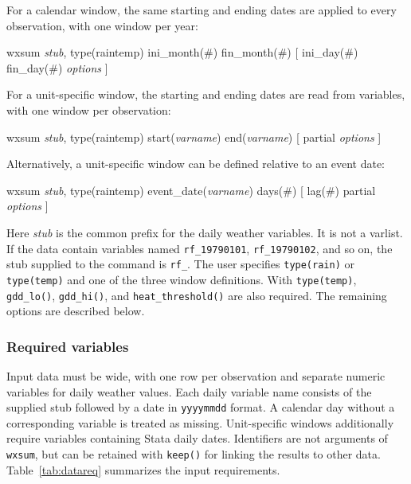For a calendar window, the same starting and ending dates are applied to every observation, with one window per year:

\begin{stsyntax}
	wxsum {\it stub\/}, type(rain\textbar temp)
	ini\_month(\#) fin\_month(\#)
	[ ini\_day(\#) fin\_day(\#) {\it options\/} ]
\end{stsyntax}

\noindent For a unit-specific window, the starting and ending dates are read from variables, with one window per observation:

\begin{stsyntax}
	wxsum {\it stub\/}, type(rain\textbar temp)
	start({\it varname\/}) end({\it varname\/})
	[ partial {\it options\/} ]
\end{stsyntax}

\noindent Alternatively, a unit-specific window can be defined relative to an event date:

\begin{stsyntax}
	wxsum {\it stub\/}, type(rain\textbar temp)
	event\_date({\it varname\/}) days(\#)
	[ lag(\#) partial {\it options\/} ]
\end{stsyntax}

\noindent Here \textit{stub} is the common prefix for the daily weather variables. It is not a varlist. If the data contain variables named \texttt{rf\_19790101}, \texttt{rf\_19790102}, and so on, the stub supplied to the command is \texttt{rf\_}. The user specifies \texttt{type(rain)} or \texttt{type(temp)} and one of the three window definitions. With \texttt{type(temp)}, \texttt{gdd\_lo()}, \texttt{gdd\_hi()}, and \texttt{heat\_threshold()} are also required. The remaining options are described below.

\subsubsection{Required variables}

Input data must be wide, with one row per observation and separate numeric variables for daily weather values. Each daily variable name consists of the supplied stub followed by a date in \texttt{yyyymmdd} format. A calendar day without a corresponding variable is treated as missing. Unit-specific windows additionally require variables containing Stata daily dates. Identifiers are not arguments of \texttt{wxsum}, but can be retained with \texttt{keep()} for linking the results to other data. Table~\ref{tab:datareq} summarizes the input requirements.


